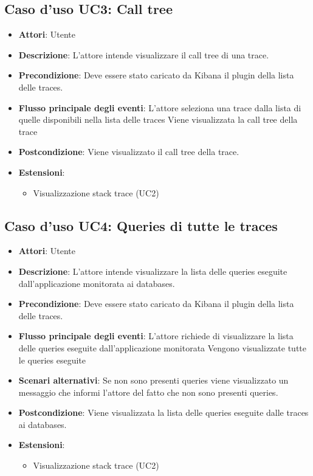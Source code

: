 \subsection{Caso d'uso UC3: Call tree}
\begin{itemize}
\item \textbf{Attori}: Utente
\item \textbf{Descrizione}: L'attore intende visualizzare il call tree di una trace.
\item \textbf{Precondizione}: Deve essere stato caricato da Kibana il plugin della lista delle traces.
\item \textbf{Flusso principale degli eventi}: L'attore seleziona una trace dalla lista di quelle disponibili nella lista delle traces
Viene visualizzata la call tree della trace
\item \textbf{Postcondizione}: Viene visualizzato il call tree della trace.
\item \textbf{Estensioni}:
\begin{itemize}
\item Visualizzazione stack trace (UC2)
\end{itemize}
\end{itemize}
\subsection{Caso d'uso UC4: Queries di tutte le traces}
\begin{itemize}
\item \textbf{Attori}: Utente
\item \textbf{Descrizione}: L'attore intende visualizzare la lista delle queries eseguite dall'applicazione monitorata ai databases.
\item \textbf{Precondizione}: Deve essere stato caricato da Kibana il plugin della lista delle traces.
\item \textbf{Flusso principale degli eventi}: L'attore richiede di visualizzare la lista delle queries eseguite dall'applicazione monitorata
Vengono visualizzate tutte le queries eseguite
\item \textbf{Scenari alternativi}: Se non sono presenti queries viene visualizzato un messaggio che informi l'attore del fatto che non sono presenti queries.
\item \textbf{Postcondizione}: Viene visualizzata la lista delle queries eseguite dalle traces ai databases.
\item \textbf{Estensioni}:
\begin{itemize}
\item Visualizzazione stack trace (UC2)
\end{itemize}
\end{itemize}
